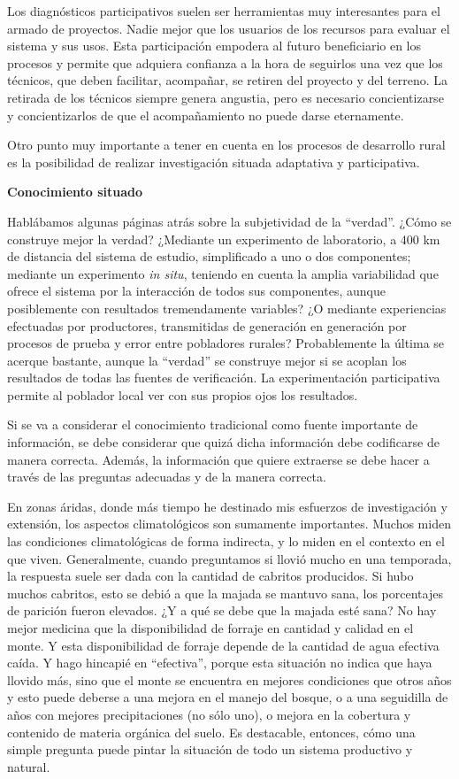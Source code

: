 \begin{fullwidth}
Los diagnósticos participativos suelen ser herramientas muy interesantes
para el armado de proyectos. Nadie mejor que los usuarios de los
recursos para evaluar el sistema y sus usos. Esta participación empodera
al futuro beneficiario en los procesos y permite que adquiera confianza
a la hora de seguirlos una vez que los técnicos, que deben facilitar,
acompañar, se retiren del proyecto y del terreno. La retirada de los
técnicos siempre genera angustia, pero es necesario concientizarse y
concientizarlos de que el acompañamiento no puede darse eternamente.

Otro punto muy importante a tener en cuenta en los procesos de
desarrollo rural es la posibilidad de realizar investigación situada
adaptativa y participativa.

\textbf{Conocimiento situado}

Hablábamos algunas páginas atrás sobre la subjetividad de la ``verdad''.
¿Cómo se construye mejor la verdad? ¿Mediante un experimento de
laboratorio, a 400 km de distancia del sistema de estudio, simplificado
a uno o dos componentes; mediante un experimento \emph{in situ},
teniendo en cuenta la amplia variabilidad que ofrece el sistema por la
interacción de todos sus componentes, aunque posiblemente con resultados
tremendamente variables? ¿O mediante experiencias efectuadas por
productores, transmitidas de generación en generación por procesos de
prueba y error entre pobladores rurales? Probablemente la última se
acerque bastante, aunque la ``verdad'' se construye mejor si se acoplan
los resultados de todas las fuentes de verificación. La experimentación
participativa permite al poblador local ver con sus propios ojos los
resultados.

Si se va a considerar el conocimiento tradicional como fuente importante
de información, se debe considerar que quizá dicha información debe
codificarse de manera correcta. Además, la información que quiere
extraerse se debe hacer a través de las preguntas adecuadas y de la
manera correcta.

En zonas áridas, donde más tiempo he destinado mis esfuerzos de
investigación y extensión, los aspectos climatológicos son sumamente
importantes. Muchos miden las condiciones climatológicas de forma
indirecta, y lo miden en el contexto en el que viven. Generalmente,
cuando preguntamos si llovió mucho en una temporada, la respuesta suele
ser dada con la cantidad de cabritos producidos. Si hubo muchos
cabritos, esto se debió a que la majada se mantuvo sana, los porcentajes
de parición fueron elevados. ¿Y a qué se debe que la majada esté sana?
No hay mejor medicina que la disponibilidad de forraje en cantidad y
calidad en el monte. Y esta disponibilidad de forraje depende de la
cantidad de agua efectiva caída. Y hago hincapié en ``efectiva'', porque
esta situación no indica que haya llovido más, sino que el monte se
encuentra en mejores condiciones que otros años y esto puede deberse a
una mejora en el manejo del bosque, o a una seguidilla de años con
mejores precipitaciones (no sólo uno), o mejora en la cobertura y
contenido de materia orgánica del suelo. Es destacable, entonces, cómo
una simple pregunta puede pintar la situación de todo un sistema
productivo y natural.


\end{fullwidth}
